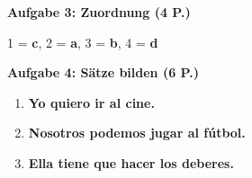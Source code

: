 \documentclass[11pt,a4paper]{article}
\newcommand{\lsg}[1]{\textcolor{loesung}{\textbf{#1}}}
\begin{document}
\begin{gruppenbox}
\vspace{0.5em}

\textbf{Aufgabe 3: Zuordnung (4 P.)}

1 = \lsg{c}, 2 = \lsg{a}, 3 = \lsg{b}, 4 = \lsg{d}

\vspace{0.5em}

\textbf{Aufgabe 4: Sätze bilden (6 P.)}
\begin{enumerate}[label=\alph*), leftmargin=2em, nosep]
    \item \lsg{Yo quiero ir al cine.}
    \item \lsg{Nosotros podemos jugar al fútbol.}
    \item \lsg{Ella tiene que hacer los deberes.}
\end{enumerate}

\end{gruppenbox}

\vspace{1em}
\end{document}
